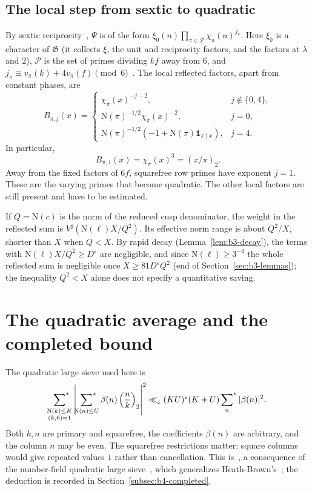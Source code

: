 \documentclass[11pt]{article}
\numberwithin{equation}{section}
\newcommand{\N}{\mathrm N}
\newcommand{\ind}{\mathbf1}
\newcommand{\ssum}{\sideset{}{^*}\sum}
\begin{document}
\subsection{The local step from sextic to quadratic}
By sextic reciprocity~\cite[\S7.3]{Lemmermeyer}, $\Psi$ is of the form
$\xi_0(n)\prod_{\pi\in\mathcal P}\chi_\pi(n)^{j_\pi}$. Here $\xi_0$ is a
character of $\mathfrak G$ (it collects $\xi$, the unit and reciprocity
factors, and the factors at $\lambda$ and $2$), $\mathcal P$ is the set
of primes dividing $kf$ away from $6$, and
$j_\pi\equiv v_\pi(k)+4v_\pi(f)\pmod6$~\cite[(6.17)]{OAI1112}.
The local reflected factors, apart from constant phases,
are~\cite[(6.5) and (A.12)]{OAI1112}
\begin{equation}\label{eq:local}
 B_{\pi,j}(x)=
 \begin{cases}
  \chi_\pi(x)^{-j-2},&j\notin\{0,4\},\\
  \N(\pi)^{-1/2}\chi_\pi(x)^{-2},&j=0,\\
  \N(\pi)^{-1/2}(-1+\N(\pi)\ind_{\pi\mid x}),&j=4.
 \end{cases}
\end{equation}
In particular,
\begin{equation}\label{eq:d054}
 B_{\pi,1}(x)=\chi_\pi(x)^3=(x/\pi)_2.
\end{equation}
Away from the fixed factors of $6f$, squarefree row primes have exponent
$j=1$. These are the varying primes that become quadratic. The other
local factors are still present and have to be estimated.

If $Q=\N(c)$ is the norm of the reduced cusp denominator, the weight
in the reflected sum is $V^\sharp(\N(\ell)X/Q^2)$. Its effective norm
range is about $Q^2/X$, shorter than $X$ when $Q<X$.
By rapid decay (Lemma~\ref{lem:b3-decay}), the terms with $\N(\ell)X/Q^2\ge D^\varepsilon$ are
negligible, and since $\N(\ell)\ge3^{-4}$ the whole reflected sum is negligible once
$X\ge81D^\varepsilon Q^2$ (end of Section~\ref{sec:b3-lemmas}); the inequality $Q^2<X$ alone does not
specify a quantitative saving.

\section{The quadratic average and the completed bound}\label{sec:sieve}

The quadratic large sieve used here is
\begin{equation}\label{eq:qls}
 \ssum_{\substack{\N(k)\le K\\(k,6)=1}}
 \left|\ssum_{\N(n)\le U}\beta(n)\left(\frac nk\right)_2\right|^2
 \ll_\varepsilon(KU)^\varepsilon(K+U)\ssum_n|\beta(n)|^2.
\end{equation}
Both $k,n$ are primary and squarefree, the coefficients $\beta(n)$ are
arbitrary, and the column $n$ may be even. The squarefree restrictions
matter: square columns would give repeated values $1$ rather than
cancellation. This is~\cite[Lemma~6.5]{OAI1112}, a consequence of the
number-field quadratic large sieve~\cite[Theorem~1.1]{GL}, which generalizes Heath-Brown's~\cite{HB95}; the deduction
is recorded in Section~\ref{subsec:b4-completed}.
\end{document}
